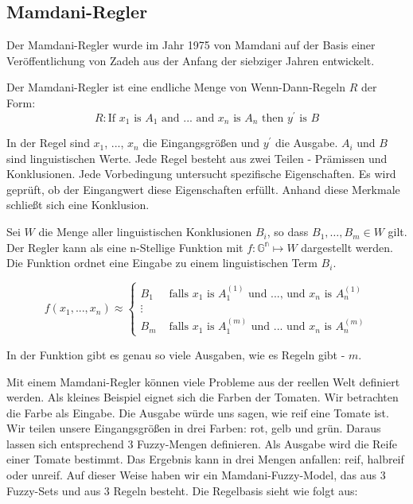 \subsection{Mamdani-Regler}

Der Mamdani-Regler wurde im Jahr 1975 von Mamdani auf der Basis einer Veröffentlichung von Zadeh aus der Anfang der siebziger Jahren entwickelt. 

Der Mamdani-Regler ist eine endliche Menge von Wenn-Dann-Regeln $R$ der Form:
\begin{equation}
	R: \text{If } x_1 \text{ is } A_1 \text{ and ... and } x_n \text{ is } A_n
	\text{ then } y^\prime \text{ is } B
\end{equation}

In der Regel sind $x_1$, ..., $x_n$ die Eingangsgrößen und $y^\prime$ die Ausgabe. $A_i$ und $B$ sind  linguistischen Werte. Jede Regel besteht aus zwei Teilen - Prämissen und Konklusionen. Jede Vorbedingung untersucht spezifische Eigenschaften. Es wird geprüft, ob der Eingangwert diese Eigenschaften erfüllt. Anhand diese Merkmale schließt sich eine Konklusion. 

Sei $W$ die Menge aller linguistischen Konklusionen $B_i$, so dass $B_1, \dots, B_m \in W$ gilt. Der Regler kann als eine n-Stellige Funktion mit $f: \mathbb{G^n} \mapsto W$ dargestellt werden. Die Funktion ordnet eine Eingabe zu einem linguistischen Term $B_i$.

\begin{equation}
	f(x_1, ..., x_n) \approx 
	\left\{
		\begin{array}{ll}
			B_1 & \mbox{ falls } x_1 \mbox{ is } A_1^{(1)} \mbox{ und ..., und } x_{n} \mbox{ is } A_n^{(1)}\\
			\vdots \\
			B_{m} & \mbox{ falls } x_1 \mbox{ is } A_1^{(m)} \mbox{ und ... und } x_{n} \mbox{ is } A_n^{(m)}
		\end{array}
	\right.
\end{equation}

In der Funktion gibt es genau so viele Ausgaben, wie es Regeln gibt - $m$.

Mit einem Mamdani-Regler können viele Probleme aus der reellen Welt definiert werden. Als kleines Beispiel eignet sich die Farben der Tomaten. Wir betrachten die Farbe als Eingabe. Die Ausgabe würde uns sagen, wie reif eine Tomate ist. Wir teilen unsere Eingangsgrößen in drei Farben: rot, gelb und grün. Daraus lassen sich entsprechend 3 Fuzzy-Mengen definieren. Als Ausgabe wird die Reife einer Tomate bestimmt. Das Ergebnis kann in drei Mengen anfallen: reif, halbreif oder unreif. Auf dieser Weise haben wir ein Mamdani-Fuzzy-Model, das aus 3 Fuzzy-Sets und aus 3 Regeln besteht. Die Regelbasis sieht wie folgt aus:

